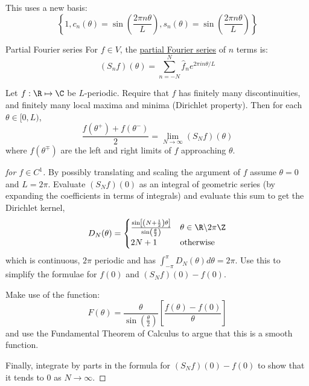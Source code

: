 \documentclass[../Main.tex]{subfiles}
\begin{document}
This uses a new basis:
\begin{equation*}
    \left\{1, c_n(\theta) = \sin\left(\frac{2\pi n \theta}{L}\right), s_n(\theta) = \sin\left(\frac{2\pi n \theta}{L}\right)\right\}
\end{equation*}
\begin{definition}{Partial Fourier series}
    For $f \in V$, the \underline{partial Fourier series} of $n$ terms is:
    \begin{equation*}
        (S_nf)(\theta) = \sum_{n = -N}^N \hat{f}_n e^{2\pi i n \theta / L}
    \end{equation*}
\end{definition}
\begin{theorem}
    Let $f : \R \mapsto \C$ be $L$-periodic. Require that $f$ has finitely many discontinuities, and finitely many local maxima and minima (Dirichlet property). Then for each $\theta \in [0, L)$,
    \begin{equation*}
        \frac{f(\theta^+) + f(\theta^-)}{2} = \lim_{N \to \infty} (S_Nf)(\theta)
    \end{equation*}
    where $f(\theta^\mp)$ are the left and right limits of $f$ approaching $\theta$.
    \label{thmFourierConverge}
\end{theorem}
\begin{proof}[for $f \in C^1$]
    By possibly translating and scaling the argument of $f$ assume $\theta = 0$ and $L = 2\pi$. Evaluate $(S_N f)(0)$ as an integral of geometric series (by expanding the coefficients in terms of integrals) and evaluate this sum to get the Dirichlet kernel,
    \begin{equation*}
        D_N(\theta) =
        \begin{cases}
            \frac{\sin\left[\left(N+\frac12\right)\theta\right]}{\sin\left(\frac{\theta}{2}\right)} & \theta \in \R \backslash 2\pi\Z \\
            2N + 1 & \text{otherwise}
        \end{cases}
    \end{equation*}
    which is continuous, $2\pi$ periodic and has $\int_{-\pi}^\pi D_N(\theta) d\theta = 2\pi$. Use this to simplify the formulae for $f(0)$ and $(S_Nf)(0) - f(0)$.

    Make use of the function:
    \begin{equation*}
        F(\theta) = \frac{\theta}{\sin\left(\frac{\theta}{2}\right)}\left[\frac{f(\theta) - f(0)}{\theta}\right]
    \end{equation*}
    and use the Fundamental Theorem of Calculus to argue that this is a smooth function.
    
    Finally, integrate by parts in the formula for $(S_Nf)(0) - f(0)$ to show that it tends to $0$ as $N \to \infty$.
\end{proof}
\end{document}
